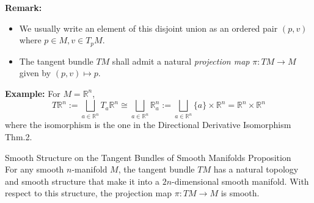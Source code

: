 \noindent\textbf{Remark:} \begin{itemize}
    \item We usually write an element of this disjoint union as an ordered pair $(p,v)$ where $p\in M, v\in T_pM$.
    \item The tangent bundle $TM$ shall admit a natural \textit{projection map} $\pi: TM\to M$ given by $(p,v) \mapsto p$.
\end{itemize}

\noindent\textbf{Example:} For $M= \mathbb{R}^n$,
\[
T\mathbb{R}^n:= \bigsqcup_{a\in \mathbb{R}^n} T_a\mathbb{R}^n \cong \bigsqcup_{a\in \mathbb{R}^n} \mathbb{R}_a^n:= \bigsqcup_{a\in \mathbb{R}^n} \{a\} \times \mathbb{R}^n= \mathbb{R}^n\times \mathbb{R}^n
\]
where the isomorphism is the one in the Directional Derivative Isomorphism Thm.2.

\begin{proposition}{Smooth Structure on the Tangent Bundles of Smooth Manifolds Proposition}\\
For any smooth $n$-manifold $M$, the tangent bundle $TM$ has a natural topology and smooth structure that make it into a $2n$-dimensional smooth manifold. With respect to this structure, the projection map $\pi: TM\to M$ is smooth.
\end{proposition}

